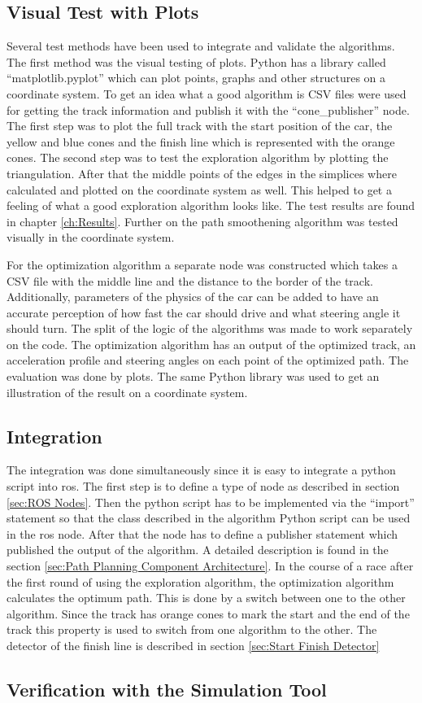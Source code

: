 \subsection{Visual Test with Plots} \label{sec:Visual Test with Plots}
Several test methods have been used to integrate and validate the algorithms. The first method was the visual testing of plots. Python has a library called ``matplotlib.pyplot'' which can plot points, graphs and other structures on a coordinate system. To get an idea what a good algorithm is CSV files were used for getting the track information and publish it with the ``cone\_publisher'' node. The first step was to plot the full track with the start position of the car, the yellow and blue cones and the finish line which is represented with the orange cones. The second step was to test the exploration algorithm by plotting the triangulation. After that the middle points of the edges in the simplices where calculated and plotted on the coordinate system as well. This helped to get a feeling of what a good exploration algorithm looks like. The test results are found in chapter \ref{ch:Results}. Further on the path smoothening algorithm was tested visually in the coordinate system.

For the optimization algorithm a separate node was constructed which takes a CSV file with the middle line and the distance to the border of the track. Additionally, parameters of the physics of the car can be added to have an accurate perception of how fast the car should drive and what steering angle it should turn. The split of the logic of the algorithms was made to work separately on the code. The optimization algorithm has an output of the optimized track, an acceleration profile and steering angles on each point of the optimized path. The evaluation was done by plots. The same Python library was used to get an illustration of the result on a coordinate system.

\subsection{Integration} \label{sec:Integration}
The integration was done simultaneously since it is easy to integrate a python script into \acrshort{ros}. The first step is to define a type of node as described in section \ref{sec:ROS Nodes}. Then the python script has to be implemented via the ``import'' statement so that the class described in the algorithm Python script can be used in the \acrshort{ros} node. After that the node has to define a publisher statement which published the output of the algorithm. A detailed description is found in the section \ref{sec:Path Planning Component Architecture}.
In the course of a race after the first round of using the exploration algorithm, the optimization algorithm calculates the optimum path. This is done by a switch between one to the other algorithm. Since the track has orange cones to mark the start and the end of the track this property is used to switch from one algorithm to the other. The detector of the finish line is described in section \ref{sec:Start Finish Detector}

\subsection{Verification with the Simulation Tool} \label{sec:Verification with the Simulation Tool}


